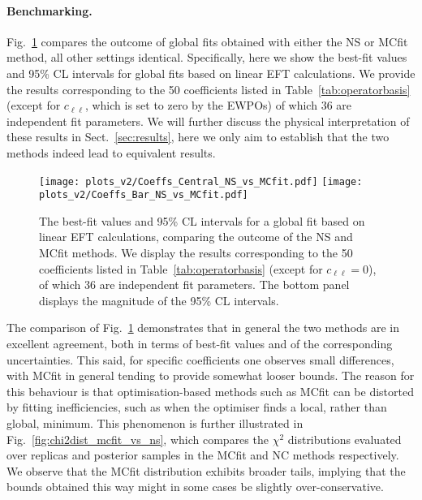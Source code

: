 \paragraph{Benchmarking.}
%
Fig.~\ref{fig:smefit-mcfit-vs-ns-global} compares
the outcome of global fits obtained with either the NS or MCfit method,
all other settings identical.
%
Specifically, here we show the best-fit values and 95\% CL intervals for global fits
based on linear EFT
calculations.
%
We provide the results corresponding to the 50 coefficients listed in Table~\ref{tab:operatorbasis}
(except for $c_{\ell\ell}$,  which is set to zero by the EWPOs)
of which 36 are independent fit parameters.
%
We will further discuss the physical interpretation of these
results in Sect.~\ref{sec:results},
here we only aim to establish that the two methods indeed lead to equivalent results.

\begin{figure}[t]
  \begin{center}
    \texttt{[image: plots\_v2/Coeffs\_Central\_NS\_vs\_MCfit.pdf]}
    \texttt{[image: plots\_v2/Coeffs\_Bar\_NS\_vs\_MCfit.pdf]}
    \vspace{-0.27cm}
    \caption{\small The best-fit values and 95\% CL intervals for a global fit based on linear EFT
      calculations, comparing the outcome of the NS and MCfit methods.
      We display the results corresponding to the 50 coefficients listed in Table~\ref{tab:operatorbasis}
      (except for $c_{\ell\ell}=0$), of which 36 are independent fit parameters.
      {  The bottom panel displays
        the magnitude of the  95\% CL intervals.}
     \label{fig:smefit-mcfit-vs-ns-global} }
  \end{center}
\end{figure}

The comparison of Fig.~\ref{fig:smefit-mcfit-vs-ns-global} demonstrates that in general
the two methods are in excellent agreement, both in terms of best-fit values
and of the corresponding uncertainties.
%
This said, for specific coefficients one observes small differences, with MCfit in general
tending to provide somewhat looser bounds.
%
The reason for this behaviour is that optimisation-based
methods such as MCfit can be distorted by fitting inefficiencies,
such as when the optimiser finds a local, rather
than global, minimum.
%
This phenomenon is further illustrated in Fig.~\ref{fig:chi2dist_mcfit_vs_ns}, which compares
the $\chi^2$ distributions evaluated over replicas
and posterior samples in the MCfit
and NC methods respectively.
%
We observe that the MCfit distribution exhibits broader tails, implying that the
 bounds obtained this way might
in some cases be slightly over-conservative.

